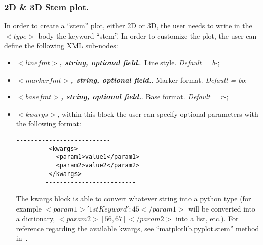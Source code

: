 \subsubsection{2D \& 3D Stem plot.}
In order to create a ``stem'' plot, either 2D or 3D, the user needs to write in the $<type>$ body the keyword ``stem''. In order to customize the plot, the user can define the following XML sub-nodes:
  \begin{itemize}
     \item $<linefmt>$\textbf{\textit{, string, optional  field.}}. Line style. \textit{Default = b-};
     \item $<markerfmt>$\textbf{\textit{, string, optional  field.}}. Marker format. \textit{Default = bo};
     \item $<basefmt>$\textbf{\textit{, string, optional  field.}}. Base format. \textit{Default = r-};
 \item \textit{$<kwargs>$},  within this block the user can specify optional parameters with the following format:
        \begin{lstlisting}[style=XML]
        --------------------------
         <kwargs>
           <param1>value1</param1>
           <param2>value2</param2>
         </kwargs>
        -------------------------
       \end{lstlisting}
         The kwargs block is able to convert whatever string into a python type (for example $<param1>{'1stKeyword':45}</param1>$ will be converted into a dictionary, $<param2>[56,67]</param2>$ into a list, etc.). For reference regarding the available kwargs, see ``matplotlib.pyplot.stem'' method in~\cite{MatPlotLib}.
    \end{itemize}

